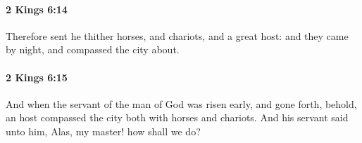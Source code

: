 		\paragraph{2 Kings 6:14} %
			\label{2KINGS-6-14}

			Therefore sent he thither horses, and chariots, and a great host: and they came by night, and compassed the city about.


		\paragraph{2 Kings 6:15} %
			\label{2KINGS-6-15}

			And when the servant of the man of God was risen early, and gone forth, behold, an host compassed the city both with horses and chariots. And his servant said unto him, Alas, my master! how shall we do?


